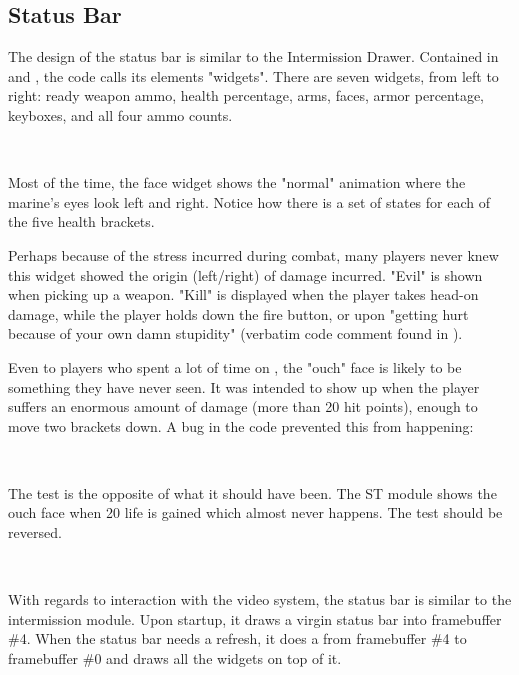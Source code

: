 \par

\subsection{Status Bar}
The design of the status bar is similar to the Intermission Drawer. Contained in  and , the code calls its elements "widgets". There are seven widgets, from left to right: ready weapon ammo, health percentage, arms, faces, armor percentage, keyboxes, and all four ammo counts.\\
\par
{}
\par

\par
\vspace{20pt}
\\ \par \vspace{10pt}
Most of the time, the face widget shows the "normal" animation where the marine's eyes look left and right. Notice how there is a set of states for each of the five health brackets.\\
\par
 Perhaps because of the stress incurred during combat, many players never knew this widget showed the origin (left/right) of damage incurred. "Evil" is shown when picking up a weapon. "Kill" is displayed when the player takes head-on damage, while the player holds down the fire button, or upon "getting hurt because of your own damn stupidity" (verbatim code comment found in ).\\
\par
Even to players who spent a lot of time on \doom, the "ouch" face is likely to be something they have never seen. It was intended to show up when the player suffers an enormous amount of damage (more than 20 hit points), enough to move two brackets down. A bug in the code prevented this from happening:\\
\par
{}\\
\par
The test is the opposite of what it should have been. The ST module shows the ouch face when 20 life is gained which almost never happens. The test should be reversed.\\
\par
{}\\
\par
With regards to interaction with the video system, the status bar is similar to the intermission module. Upon startup, it draws a virgin status bar into framebuffer \#4. When the status bar needs a refresh, it does a  from framebuffer \#4 to framebuffer \#0 and draws all the widgets on top of it.\\
\par
{}
